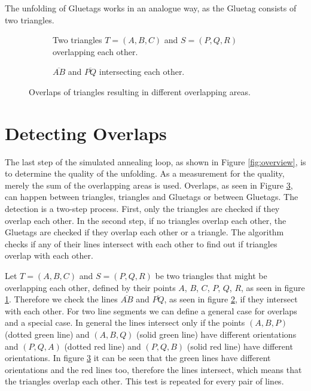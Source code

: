 \documentclass[draft,final]{vutinfth} %
\begin{document}
The unfolding of Gluetags works in an analogue way, as the Gluetag consists of two triangles.

\begin{figure}
\centering
\begin{subfigure}[t]{.4\textwidth}
	
  \caption{Two triangles $T = (A,B,C)$ and $S = (P,Q,R)$ overlapping each other.}
	\label{fig:figtrioverlap}
\end{subfigure}%
\hspace{.1\textwidth}
\begin{subfigure}[t]{.4\textwidth}
	
	\caption{$\overline{AB}$ and $\overline{PQ}$ intersecting each other.}
	\label{fig:figlineintersection}
\end{subfigure}
\caption{Overlaps of triangles resulting in different overlapping areas.}
\label{fig:overlap}
\end{figure}

\section{Detecting Overlaps}
\label{sec:overlaps}
The last step of the simulated annealing loop, as shown in Figure \ref{fig:overview}, is to determine the quality of the unfolding. As a measurement for the quality, merely the sum of the overlapping areas is used. Overlaps, as seen in Figure \ref{fig:overlap}, can happen between triangles, triangles and Gluetags or between Gluetags. The detection is a two-step process. First, only the triangles are checked if they overlap each other. In the second step, if no triangles overlap each other, the Gluetags are checked if they overlap each other or a triangle. The algorithm checks if any of their lines intersect with each other to find out if triangles overlap with each other.

Let $T = (A,B,C)$ and $S = (P,Q,R)$ be two triangles that might be overlapping each other, defined by their points $A$, $B$, $C$, $P$, $Q$, $R$, as seen in figure \ref{fig:figtrioverlap}. Therefore we check the lines $\overline{AB}$ and $\overline{PQ}$, as seen in figure \ref{fig:figlineintersection}, if they intersect with each other. For two line segments we can define a general case for overlaps and a special case. In general the lines intersect only if the points $(A,B,P)$ (dotted green line) and $(A,B,Q)$ (solid green line) have different orientations and $(P,Q,A)$ (dotted red line) and $(P,Q,B)$ (solid red line) have different orientations. In figure \ref{fig:overlap} it can be seen that the green lines have different orientations and the red lines too, therefore the lines intersect, which means that the triangles overlap each other. This test is repeated for every pair of lines.
\end{document}
